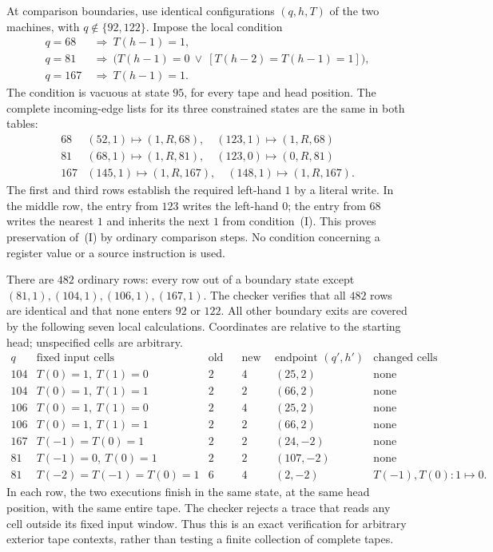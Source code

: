 At comparison boundaries, use identical configurations $(q,h,T)$ of the
two machines, with $q\notin\{92,122\}$.  Impose the local condition
\[
\begin{aligned}
q=68&\ \Longrightarrow\ T(h-1)=1,\\
q=81&\ \Longrightarrow\
  \bigl(T(h-1)=0\ \lor\ [T(h-2)=T(h-1)=1]\bigr),\\
q=167&\ \Longrightarrow\ T(h-1)=1.
\end{aligned}
\tag{I}
\]
The condition is vacuous at state $95$, for every tape and head position.
The complete incoming-edge lists for its three constrained states are the
same in both tables:
\[
\begin{array}{c|l}
68&(52,1)\mapsto(1,R,68),\quad(123,1)\mapsto(1,R,68)\\
81&(68,1)\mapsto(1,R,81),\quad(123,0)\mapsto(0,R,81)\\
167&(145,1)\mapsto(1,R,167),\quad(148,1)\mapsto(1,R,167).
\end{array}
\]
The first and third rows establish the required left-hand $1$ by a literal
write.  In the middle row, the entry from $123$ writes the left-hand $0$;
the entry from $68$ writes the nearest $1$ and inherits the next $1$ from
condition~(I).  This proves preservation of~(I) by ordinary comparison
steps.  No condition concerning a register value or a source instruction
is used.

There are $482$ ordinary rows: every row out of a boundary state except
$(81,1),(104,1),(106,1),(167,1)$.  The checker verifies that all $482$ rows
are identical and that none enters $92$ or $122$.  All other boundary
exits are covered by the following seven local calculations.  Coordinates
are relative to the starting head; unspecified cells are arbitrary.
\[
\begin{array}{c|l|c|c|c|l}
q&\text{fixed input cells}&\text{old steps}&\text{new steps}
  &\text{endpoint }(q',h')&\text{changed cells}\\ \hline
104&T(0)=1,\ T(1)=0&2&4&(25,2)&\text{none}\\
104&T(0)=1,\ T(1)=1&2&2&(66,2)&\text{none}\\
106&T(0)=1,\ T(1)=0&2&4&(25,2)&\text{none}\\
106&T(0)=1,\ T(1)=1&2&2&(66,2)&\text{none}\\
167&T(-1)=T(0)=1&2&2&(24,-2)&\text{none}\\
81&T(-1)=0,\ T(0)=1&2&2&(107,-2)&\text{none}\\
81&T(-2)=T(-1)=T(0)=1&6&4&(2,-2)&T(-1),T(0):1\mapsto0.
\end{array}
\tag{L}
\]
In each row, the two executions finish in the same state, at the same
head position, with the same entire tape.  The checker rejects a trace
that reads any cell outside its fixed input window.  Thus this is an
exact verification for arbitrary exterior tape contexts, rather than
testing a finite collection of complete tapes.

